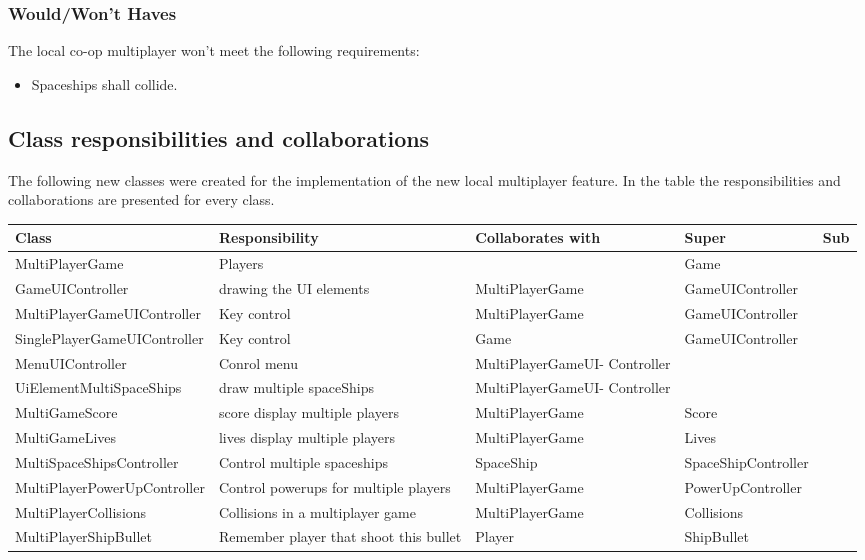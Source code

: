 \documentclass[10pt]{article}
\begin{document}
\subsubsection{Would/Won't Haves}
The local co-op multiplayer won't meet the following requirements:
\begin{itemize}
	\item Spaceships shall collide.
\end{itemize}
\newpage

\subsection{Class responsibilities and collaborations}


The following new classes were created for the implementation of the new local multiplayer feature.
In the table the responsibilities and collaborations are presented for every class.
\begin{center}
    \begin{tabular}{ | p{4.5cm} | p{3cm} | p{3cm} | p{3cm} | p{1cm} |}
  \hline
    Class & Responsibility & Collaborates with & Super & Sub \\ \hline
   MultiPlayerGame & Players  & & Game & \\ \hline
   GameUIController & drawing the UI elements & MultiPlayerGame  & GameUIController  & \\ \hline
 MultiPlayerGameUIController & Key control & MultiPlayerGame  & GameUIController  & \\ \hline
 SinglePlayerGameUIController & Key control & Game  & GameUIController  & \\ \hline
   MenuUIController& Conrol menu & MultiPlayerGameUI- Controller  &   &  \\ \hline
   UiElementMultiSpaceShips& draw multiple spaceShips & MultiPlayerGameUI- Controller  &  &  \\ \hline
 MultiGameScore & score display multiple players &  MultiPlayerGame  &  Score  & \\ \hline
 MultiGameLives &  lives display multiple players & MultiPlayerGame  & Lives  & \\ \hline
 MultiSpaceShipsController& Control multiple spaceships & SpaceShip  & SpaceShipController &  \\ \hline
 MultiPlayerPowerUpController& Control powerups for multiple players & MultiPlayerGame   & PowerUpController &  \\ \hline
 MultiPlayerCollisions & Collisions in a multiplayer game & MultiPlayerGame   & Collisions&  \\ \hline
 MultiPlayerShipBullet & Remember player that shoot this bullet & Player  & ShipBullet &  \\ \hline

    \end{tabular}
\end{center}
\end{document}
